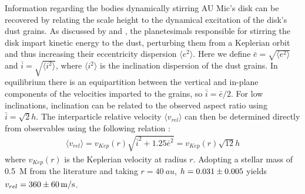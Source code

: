 \documentclass[modern]{aastex62}
\begin{document}
Information regarding the bodies dynamically stirring AU Mic's disk can be recovered by relating the scale height to the dynamical excitation of the disk's dust grains.
As discussed by \cite{thebault09} and \cite{quillen07}, the planetesimals responsible for stirring the disk impart kinetic energy to the dust, perturbing them from a Keplerian orbit and thus increasing their eccentricity dispersion $\langle e^2 \rangle$. 
Here we define $\bar{e} = \sqrt{\langle e^2 \rangle}$ and $\bar{i} = \sqrt{\langle i^2 \rangle}$, where $\langle i^2 \rangle$ is the inclination dispersion of the dust grains.
In equilibrium there is an equipartition between the vertical and in-plane components of the velocities imparted to the grains, so $\bar{i} = {\bar{e}}/{2}$.
For low inclinations, inclination can be related to the observed aspect ratio using $\bar{i} = \sqrt{2}h$.
The interparticle relative velocity $\langle v_{rel} \rangle$ can then be determined directly from observables using the following relation \citep{wetherill&stewart93,wyatt&dent02}:
\begin{gather}
  \langle v_{rel} \rangle = v_{Kep}(r) \sqrt{\bar{i}^2 + 1.25 \bar{e}^2} = v_{Kep}(r) \sqrt{12} h
\end{gather}
where $v_{Kep}(r)$ is the Keplerian velocity at radius $r$. 
Adopting a stellar mass of \SI{0.5}{M_\sun} from the literature \citep{plavchan09,houdebine&doyle94} and taking $r = \SI{40}{au}$, $h=\num{0.031 \pm 0.005}$ yields $v_{rel} = \SI{360 \pm 60}{m/s}$.
\end{document}
